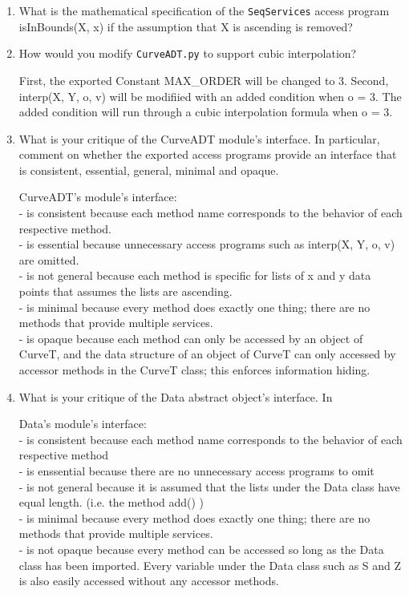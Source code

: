 \documentclass[12pt]{article}
\begin{document}
\begin{enumerate}

\item What is the mathematical specification of the \texttt{SeqServices} access
  program isInBounds(X, x) if the assumption that X is ascending is removed?


\item How would you modify \texttt{CurveADT.py} to support cubic interpolation?

First, the exported Constant MAX\_ORDER will be changed to 3. Second, interp(X, Y, o, v) will be modifiied with an added condition when o = 3. The added condition will run through a cubic interpolation formula when o = 3.


\item What is your critique of the CurveADT module's interface.  In particular,
  comment on whether the exported access programs provide an interface that is
  consistent, essential, general, minimal and opaque.

CurveADT's module's interface:\\
- is consistent because each method name corresponds to the behavior of each respective method.\\
- is essential because unnecessary access programs such as interp(X, Y, o, v) are omitted.\\
- is not general because each method is specific for lists of x and y data points that assumes the lists are ascending.\\
- is minimal because every method does exactly one thing; there are no methods that provide multiple services. \\
- is opaque because each method can only be accessed by an object of CurveT, and the data structure of an object of CurveT can only accessed by accessor methods in the CurveT class; this enforces information hiding.


\item What is your critique of the Data abstract object's interface.  In

Data's module's interface:\\
- is consistent because each method name corresponds to the behavior of each respective method\\
- is enssential because there are no unnecessary access programs to omit\\
- is not general because it is assumed that the lists under the Data class have equal length. (i.e. the method add() )\\
- is minimal because every method does exactly one thing; there are no methods that provide multiple services. \\
- is not opaque because every method can be accessed so long as the Data class has been imported. Every variable under the Data class such as S and Z is also easily accessed without any accessor methods. 

\end{enumerate}
\end{document}
